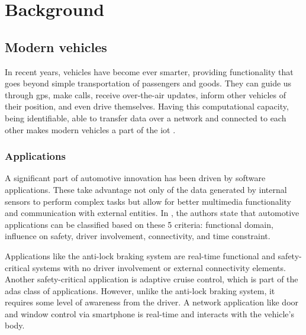 \chapter{Background}
\label{c:background}

\section{Modern vehicles}

In recent years, vehicles have become ever smarter, providing functionality that goes beyond simple transportation of passengers and goods. They can guide us through \gls{gps}, make calls, receive over-the-air updates, inform other vehicles of their position, and even drive themselves. Having this computational capacity, being identifiable, able to transfer data over a network and connected to each other makes modern vehicles a part of the \acrlong{iot} \citep{Lombardi2021}.\par

\subsection{Applications}

A significant part of automotive innovation has been driven by software applications. These take advantage not only of the data generated by internal sensors to perform complex tasks but allow for better multimedia functionality and communication with external entities. In \cite{Le2018}, the authors state that automotive applications can be classified based on these 5 criteria: functional domain, influence on safety, driver involvement, connectivity, and time constraint.\par

Applications like the anti-lock braking system are real-time functional and safety-critical systems with no driver involvement or external connectivity elements. Another safety-critical application is adaptive cruise control, which is part of the \gls{adas} class of applications. However, unlike the anti-lock braking system, it requires some level of awareness from the driver. A network application like door and window control via smartphone is real-time and interacts with the vehicle’s body.\par


